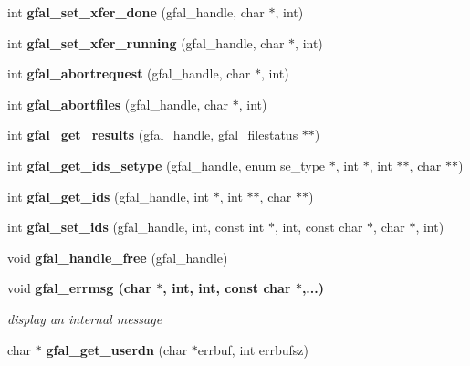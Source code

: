 \begin{CompactItemize}
\item 
int \textbf{gfal\_\-set\_\-xfer\_\-done} (gfal\_\-handle, char $\ast$, int)\label{gfal__common_8h_0dd3f7181d48d5311146106ec2eaba8a}

\item 
int \textbf{gfal\_\-set\_\-xfer\_\-running} (gfal\_\-handle, char $\ast$, int)\label{gfal__common_8h_e907a676c77e646e5a878e1db1fdcd96}

\item 
int \textbf{gfal\_\-abortrequest} (gfal\_\-handle, char $\ast$, int)\label{gfal__common_8h_c38428bec7d99cd8e97f8c2cecb02c26}

\item 
int \textbf{gfal\_\-abortfiles} (gfal\_\-handle, char $\ast$, int)\label{gfal__common_8h_492b7ad68bbcc21f29a4f7de5787bd58}

\item 
int \textbf{gfal\_\-get\_\-results} (gfal\_\-handle, gfal\_\-filestatus $\ast$$\ast$)\label{gfal__common_8h_eae3f1d564f4e403597f5024c3d2d606}

\item 
int \textbf{gfal\_\-get\_\-ids\_\-setype} (gfal\_\-handle, enum se\_\-type $\ast$, int $\ast$, int $\ast$$\ast$, char $\ast$$\ast$)\label{gfal__common_8h_2bed7d372296a8d43282cea69ccb663e}

\item 
int \textbf{gfal\_\-get\_\-ids} (gfal\_\-handle, int $\ast$, int $\ast$$\ast$, char $\ast$$\ast$)\label{gfal__common_8h_72418d9d0374b8beca6fca284a8e5db2}

\item 
int \textbf{gfal\_\-set\_\-ids} (gfal\_\-handle, int, const int $\ast$, int, const char $\ast$, char $\ast$, int)\label{gfal__common_8h_5da8c01443270bf26cb6f60fe1457c53}

\item 
void \textbf{gfal\_\-handle\_\-free} (gfal\_\-handle)\label{gfal__common_8h_a21bc6b4163400d28590637b474a1b05}

\item 
void \bf{gfal\_\-errmsg} (char $\ast$, int, int, const char $\ast$,...)
\begin{CompactList}\small\item\em display an internal message \item\end{CompactList}\item 
char $\ast$ \textbf{gfal\_\-get\_\-userdn} (char $\ast$errbuf, int errbufsz)\label{group__internal__group_g6bd6336b0fee1ff32ad6bc5ef3d96068}


\end{CompactItemize}
